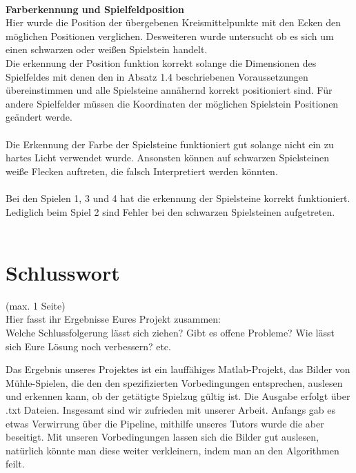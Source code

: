 \documentclass[paper=A4, deutsch]{scrartcl}
\begin{document}
\\
\textbf{Farberkennung und Spielfeldposition} \\
Hier wurde die Position der übergebenen Kreismittelpunkte mit den Ecken den möglichen Positionen verglichen. Desweiteren wurde untersucht ob es sich um einen schwarzen oder weißen Spielstein handelt. \\
Die erkennung der Position funktion korrekt solange die Dimensionen des Spielfeldes mit denen den in Absatz 1.4 beschriebenen Voraussetzungen übereinstimmen und alle Spielsteine annähernd korrekt positioniert sind. Für andere Spielfelder müssen die Koordinaten der möglichen Spielstein Positionen geändert werde. \\
\\
Die Erkennung der Farbe der Spielsteine funktioniert gut solange nicht ein zu hartes Licht verwendet wurde. Ansonsten können auf schwarzen Spielsteinen weiße Flecken auftreten, die falsch Interpretiert werden könnten. \\
\\
Bei den Spielen 1, 3 und 4 hat die erkennung der Spielsteine korrekt funktioniert. Lediglich beim Spiel 2 sind Fehler bei den schwarzen Spielsteinen aufgetreten. \\
\\






\section{Schlusswort}
(max. 1 Seite)\\
Hier fasst ihr Ergebnisse Eures Projekt zusammen:\\
Welche Schlussfolgerung lässt sich ziehen? Gibt es offene Probleme? Wie lässt sich Eure Lösung noch verbessern? etc.

Das Ergebnis unseres Projektes ist ein lauffähiges Matlab-Projekt, das Bilder von Mühle-Spielen, die den den spezifizierten Vorbedingungen entsprechen, auslesen und erkennen kann, ob der getätigte Spielzug gültig ist. Die Ausgabe erfolgt über .txt Dateien. 
Insgesamt sind wir zufrieden mit unserer Arbeit. Anfangs gab es etwas Verwirrung über die Pipeline, mithilfe unseres Tutors wurde die aber beseitigt.
Mit unseren Vorbedingungen lassen sich die Bilder gut auslesen, natürlich könnte man diese weiter verkleinern, indem man an den Algorithmen feilt.





\end{document}
